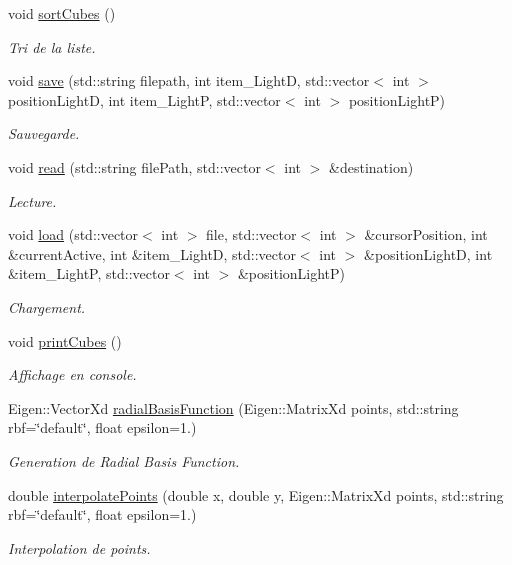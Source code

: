 \begin{DoxyCompactItemize}
void \hyperlink{classglimac_1_1CubeList_af6615c0db1a97fcae5df6f27de71b6d8}{sort\+Cubes} ()
\begin{DoxyCompactList}\small\item\em Tri de la liste. \end{DoxyCompactList}\item 
void \hyperlink{classglimac_1_1CubeList_a9e7ac57439f018d89b71c6071efd48e6}{save} (std\+::string filepath, int item\+\_\+\+LightD, std\+::vector$<$ int $>$ position\+LightD, int item\+\_\+\+LightP, std\+::vector$<$ int $>$ position\+LightP)
\begin{DoxyCompactList}\small\item\em Sauvegarde. \end{DoxyCompactList}\item 
void \hyperlink{classglimac_1_1CubeList_a59d87cac2e218d617940ccdab5235b31}{read} (std\+::string file\+Path, std\+::vector$<$ int $>$ \&destination)
\begin{DoxyCompactList}\small\item\em Lecture. \end{DoxyCompactList}\item 
void \hyperlink{classglimac_1_1CubeList_a6f615ea1238b29f8e19859b528ac6f26}{load} (std\+::vector$<$ int $>$ file, std\+::vector$<$ int $>$ \&cursor\+Position, int \&current\+Active, int \&item\+\_\+\+LightD, std\+::vector$<$ int $>$ \&position\+LightD, int \&item\+\_\+\+LightP, std\+::vector$<$ int $>$ \&position\+LightP)
\begin{DoxyCompactList}\small\item\em Chargement. \end{DoxyCompactList}\item 
void \hyperlink{classglimac_1_1CubeList_a5c3e997708642903eb6b4c806de0cdf9}{print\+Cubes} ()
\begin{DoxyCompactList}\small\item\em Affichage en console. \end{DoxyCompactList}\item 
Eigen\+::\+Vector\+Xd \hyperlink{classglimac_1_1CubeList_a538bbaae516f90563e233ef4b183c772}{radial\+Basis\+Function} (Eigen\+::\+Matrix\+Xd points, std\+::string rbf=\char`\"{}default\char`\"{}, float epsilon=1.)
\begin{DoxyCompactList}\small\item\em Generation de Radial Basis Function. \end{DoxyCompactList}\item 
double \hyperlink{classglimac_1_1CubeList_ac4b12134064f67c17192b9c81796792e}{interpolate\+Points} (double x, double y, Eigen\+::\+Matrix\+Xd points, std\+::string rbf=\char`\"{}default\char`\"{}, float epsilon=1.)
\begin{DoxyCompactList}\small\item\em Interpolation de points. \end{DoxyCompactList}\end{DoxyCompactItemize}


